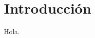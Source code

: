 \documentclass[main.tex]{subfiles}
\begin{document}
\chapter{Introducción}

Hola.

\ifSubfilesClassLoaded{
    
}{}
\end{document}
